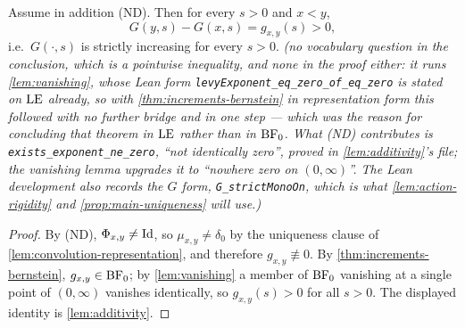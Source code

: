 \begin{corollary}\label{cor:strict-monotonicity}
\leanok
Assume in addition (ND). Then for every $s > 0$ and $x < y$,
\[
  G(y, s) - G(x, s) = g_{x,y}(s) > 0,
\]
i.e.\ $G(\cdot, s)$ is strictly increasing for every $s > 0$.
\statusT\quad\emph{(no vocabulary question in the conclusion, which is a pointwise inequality,
and none in the proof either: it runs \ref{lem:vanishing}, whose Lean form
\texttt{levyExponent\_eq\_zero\_of\_eq\_zero} is stated on $\mathrm{LE}$ already, so with
\ref{thm:increments-bernstein} in representation form this followed with no further bridge and
in one step --- which was the reason for concluding that theorem in $\mathrm{LE}$ rather than in $\mathrm{BF}_0$.
What (ND) contributes is \texttt{exists\_exponent\_ne\_zero}, ``not identically zero'', proved
in \ref{lem:additivity}'s file; the vanishing lemma upgrades it to ``nowhere zero on
$(0,\infty)$''. The Lean development also records the $G$ form,
\texttt{G\_strictMonoOn}, which is what \ref{lem:action-rigidity} and
\ref{prop:main-uniqueness} will use.)}
\end{corollary}

\begin{proof}
\leanok
By (ND), $\Phi_{x,y} \ne \mathrm{Id}$, so $\mu_{x,y} \ne \delta_0$ by the uniqueness clause of
\ref{lem:convolution-representation}, and therefore $g_{x,y} \not\equiv 0$. By
\ref{thm:increments-bernstein}, $g_{x,y} \in \mathrm{BF}_0$; by \ref{lem:vanishing} a member of $\mathrm{BF}_0$
vanishing at a single point of $(0,\infty)$ vanishes identically, so $g_{x,y}(s) > 0$ for all
$s > 0$. The displayed identity is \ref{lem:additivity}.
\end{proof}
